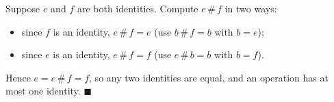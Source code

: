 Suppose $e$ and $f$ are both identities. Compute $e\,\#\,f$ in two ways:
\begin{itemize}
\item since $f$ is an identity, $e\,\#\,f=e$ (use $b\,\#\,f=b$ with $b=e$);
\item since $e$ is an identity, $e\,\#\,f=f$ (use $e\,\#\,b=b$ with $b=f$).
\end{itemize}
Hence $e=e\,\#\,f=f$, so any two identities are equal, and an operation has at most one identity. $\blacksquare$

